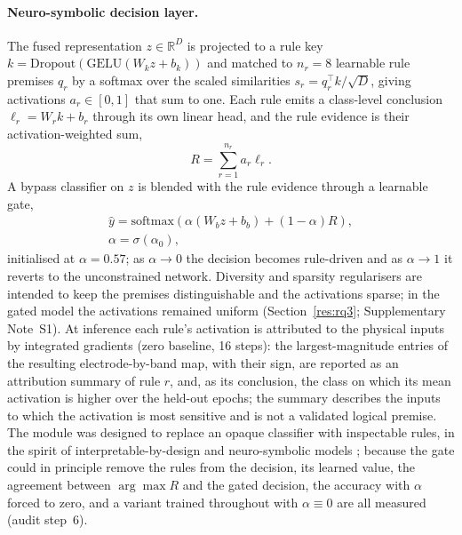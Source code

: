 \paragraph{Neuro-symbolic decision layer.} The fused representation $z\in\mathbb{R}^D$ is projected to a rule key $k=\mathrm{Dropout}(\mathrm{GELU}(W_k z + b_k))$ and matched to $n_r=8$ learnable rule premises $q_r$ by a softmax over the scaled similarities $s_r=q_r^{\top}k/\sqrt{D}$, giving activations $a_r\in[0,1]$ that sum to one. Each rule emits a class-level conclusion $\ell_r=W_r k+b_r$ through its own linear head, and the rule evidence is their activation-weighted sum,
\begin{equation}
R = \sum_{r=1}^{n_r} a_r \ell_r . \label{eq17}
\end{equation}
A bypass classifier on $z$ is blended with the rule evidence through a learnable gate,
\begin{equation}
\begin{gathered}
\hat y = \mathrm{softmax}\!\left(\alpha(W_b z + b_b) + (1-\alpha) R\right),\\
\alpha=\sigma(\alpha_0),
\end{gathered} \label{eq18}
\end{equation}
initialised at $\alpha=0.57$; as $\alpha\to0$ the decision becomes rule-driven and as $\alpha\to1$ it reverts to the unconstrained network. Diversity and sparsity regularisers are intended to keep the premises distinguishable and the activations sparse; in the gated model the activations remained uniform (Section~\ref{res:rq3}; Supplementary Note~S1). At inference each rule's activation is attributed to the physical inputs by integrated gradients \cite{ref54} (zero baseline, 16 steps): the largest-magnitude entries of the resulting electrode-by-band map, with their sign, are reported as an attribution summary of rule $r$, and, as its conclusion, the class on which its mean activation is higher over the held-out epochs; the summary describes the inputs to which the activation is most sensitive and is not a validated logical premise. The module was designed to replace an opaque classifier with inspectable rules, in the spirit of interpretable-by-design and neuro-symbolic models \cite{ref45,ref46,ref47}; because the gate could in principle remove the rules from the decision, its learned value, the agreement between $\arg\max R$ and the gated decision, the accuracy with $\alpha$ forced to zero, and a variant trained throughout with $\alpha\equiv0$ are all measured (audit step~6).

